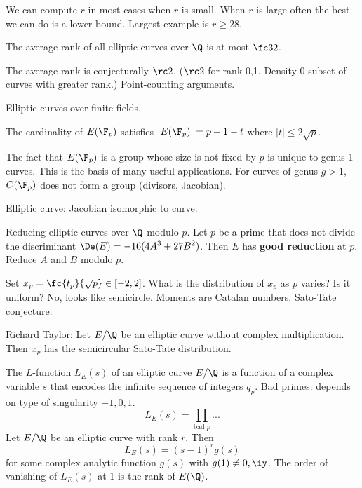 We can compute $r$ in most cases when $r$ is small. When $r$ is large often the best we can do is a lower bound. Largest example is $r\ge 28$.

\begin{thm}
The average rank of all elliptic curves over $\Q$ is at most $\fc 32$.
\end{thm}
The average rank is conjecturally $\rc 2$. ($\rc 2$ for rank 0,1. 
Density 0 subset of curves with greater rank.) Point-counting arguments.

Elliptic curves over finite fields.
\begin{thm}[Hasse]
The cardinality of $E(\F_p)$ satisfies $|E(\F_p)|=p+1-t$ where $|t|\le 2\sqrt p$.
\end{thm}
The fact that $E(\F_p)$ is a group whose size is not fixed by $p$ is unique to genus 1 curves. This is the basis of many useful applications. For curves of genus $g>1$, $C(\F_p)$ does not form a group (divisors, Jacobian).

Elliptic curve: Jacobian isomorphic to curve.

Reducing elliptic curves over $\Q$ modulo $p$. Let $p$ be a prime that does not divide the discriminant $\De(E)=-16(4A^3+27B^2)$. Then $E$ has \textbf{good reduction} at $p$. Reduce $A$ and $B$ modulo $p$.

Set $x_p=\fc{t_p}{\sqrt p}\in [-2,2]$. What is the distribution of $x_p$ as $p$ varies? Is it uniform? No, looks like semicircle.
Moments are Catalan numbers. Sato-Tate conjecture.

Richard Taylor: Let $E/\Q$ be an elliptic curve without complex multiplication. Then $x_p$ has the semicircular Sato-Tate distribution.

\begin{conj}
The $L$-function $L_E(s)$ of an elliptic curve $E/\Q$ is a function of a complex variable $s$ that encodes the infinite sequence of integers $q_p$. Bad primes: depends on type of singularity $-1,0,1$. 
\[
L_E(s)=\prod_{\text{bad }p}...
\]
Let $E/\Q$ be an elliptic curve with rank $r$. Then
\[
L_E(s)=(s-1)^r g(s)
\]
for some complex analytic function $g(s)$ with $g(1)\ne 0,\iy$. The order of vanishing of $L_E(s)$ at 1 is the rank of $E(\Q)$.
\end{conj}

